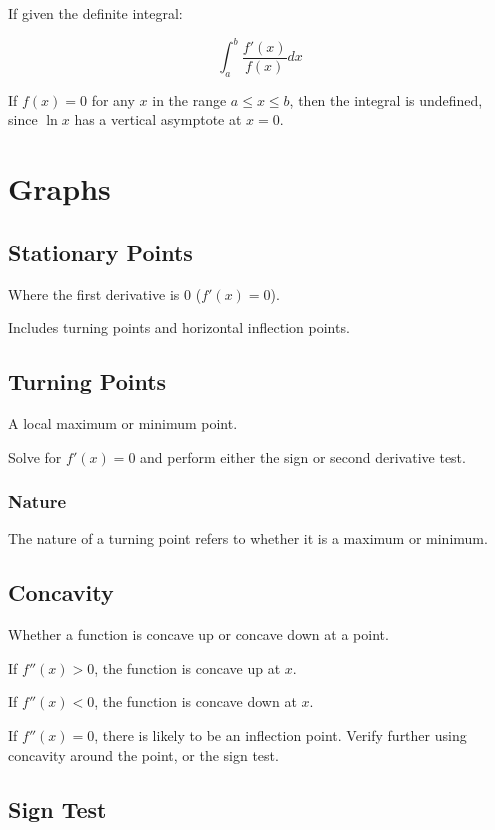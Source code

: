 \documentclass[a4paper,11pt]{article}
\begin{document}
If given the definite integral:

$$
\int_a^b \frac{f'(x)}{f(x)} dx
$$

If $f(x) = 0$ for any $x$ in the range $a \leq x \leq b$, then the integral is
undefined, since $\ln{x}$ has a vertical asymptote at $x = 0$.




\section{Graphs}

\subsection{Stationary Points}

Where the first derivative is 0 ($f'(x) = 0$).

Includes turning points and horizontal inflection points.


\subsection{Turning Points}

A local maximum or minimum point.

Solve for $f'(x) = 0$ and perform either the sign or second derivative test.


\subsubsection{Nature}

The nature of a turning point refers to whether it is a maximum or minimum.


\subsection{Concavity}

Whether a function is concave up or concave down at a point.

If $f''(x) > 0$, the function is concave up at $x$.

If $f''(x) < 0$, the function is concave down at $x$.

If $f''(x) = 0$, there is likely to be an inflection point. Verify further using
concavity around the point, or the sign test.


\subsection{Sign Test}
\end{document}
